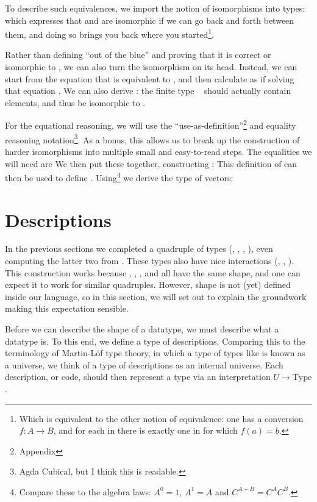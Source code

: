 To describe such equivalences, we import the notion of isomorphisms into types:
which expresses that  and  are isomorphic if we can go back and forth between them, and doing so brings you back where you started\footnote{Which is equivalent to the other notion of equivalence: one has a conversion $f : A \to B$, and for each  in  there is exactly one  in  for which $f(a) = b$.}.

Rather than defining  ``out of the blue'' and proving that it is correct or isomorphic to , we can also turn the isomorphism on its head. Instead, we can start from the equation that  is equivalent to , and then calculate  as if solving that equation \cite{calcdata}. We can also derive : the finite type \  should actually contain  elements, and thus be isomorphic to .

For the equational reasoning, we will use the ``use-as-definition''\footnote{Appendix} and equality reasoning notation\footnote{Agda Cubical, but I think this is readable.}. As a bonus, this allows us to break up the construction of harder isomorphisms into multiple small and easy-to-read steps. The equalities we will need are 
We then put these together, constructing :
This definition of  can then be used to define . Using\footnote{Compare these to the algebra laws: $A^0 = 1$, $A^1 = A$ and $C^{A + B} = C^A C^B$.}
we derive the type of vectors:


\section{Descriptions}\label{sec:background-descriptions}
In the previous sections we completed a quadruple of types (\bN{}, , , ), even computing the latter two from \bN{}. These types also have nice interactions (, , ). This construction works because \bN{}, , , and  all have the same shape, and one can expect it to work for similar quadruples. However, shape is not (yet) defined inside our language, so in this section, we will set out to explain the groundwork making this expectation sensible.

Before we can describe the shape of a datatype, we must describe what a datatype is. To this end, we define a type of descriptions. Comparing this to the terminology of Martin-L{\"{o}}f type theory\cite{mltt,levitation}, in which a type of types like  is known as a universe, we think of a type of descriptions as an internal universe. Each description, or code, should then represent a type via an interpretation $U \to \mathrm{Type}$. 

